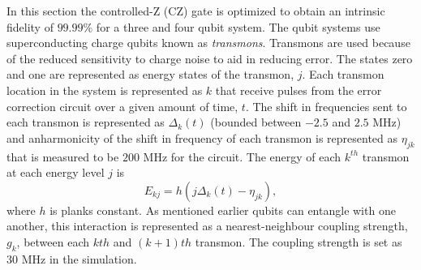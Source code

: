 In this section the controlled-Z (CZ) gate is optimized to obtain an intrinsic fidelity of $99.99\%$ for a three and four qubit system. The qubit systems use superconducting charge qubits known as \textit{transmons}. Transmons are used because of the reduced sensitivity to charge
noise to aid in reducing error. The states zero and one are represented as energy states of the transmon, $j$. Each transmon location in the system is represented as $k$ that receive pulses from the error correction circuit over a given amount of time, $t$. The shift in frequencies sent to each transmon is represented as $\Delta_k(t)$ (bounded between $-2.5$ and $2.5$ MHz) and anharmonicity of the shift in frequency of each transmon is represented as $\eta_{jk}$ that is measured to be $200$ MHz for the circuit. The
energy of each $k^{th}$ transmon at each energy level $j$ is
\begin{equation}
    \label{eq:energy}
    E_{kj} = h(j\Delta_k(t)-\eta_{jk}),
\end{equation}
where $h$ is planks constant. As mentioned earlier qubits can entangle with one another, this interaction is represented as a nearest-neighbour coupling strength, $g_k$, between each $kth$ and $(k+1)th$ transmon. The coupling strength is set as $30$ MHz in the simulation.  

